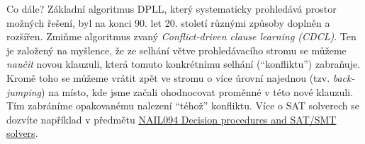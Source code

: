 Co dále? Základní algoritmus DPLL, který systematicky prohledává prostor možných řešení, byl na konci 90. let 20. století různými způsoby doplněn a rozšířen. Zmiňme algoritmus zvaný \emph{Conflict-driven clause learning (CDCL)}. Ten je založený na myšlence, že ze selhání větve prohledávacího stromu se můžeme \emph{naučit} novou klauzuli, která tomuto konkrétnímu selhání (``konfliktu'') zabraňuje. Kromě toho se můžeme vrátit zpět ve stromu o více úrovní najednou (tzv. \emph{back-jumping}) na místo, kde jsme začali ohodnocovat proměnné v této nové klauzuli. Tím zabráníme opakovanému nalezení ``téhož'' konfliktu. Více o SAT solverech se dozvíte například v předmětu \href{https://is.cuni.cz/studium/predmety/index.php?do=predmet&kod=NAIL094}{NAIL094 Decision procedures and SAT/SMT solvers}.